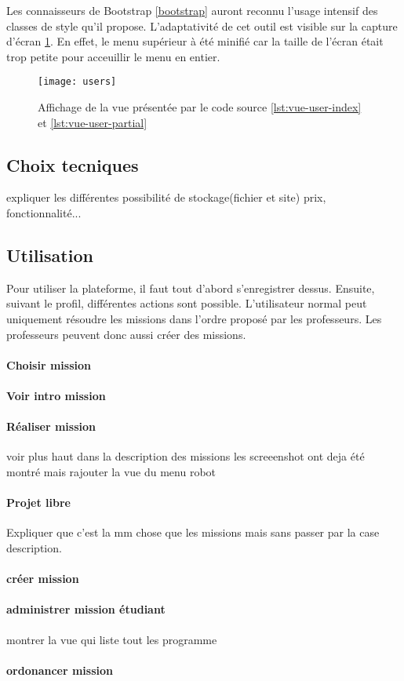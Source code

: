 Les connaisseurs de Bootstrap \ref{bootstrap} auront reconnu l'usage intensif des classes de style qu'il propose. L'adaptativité de cet outil est visible sur la capture d'écran \ref{fig:vue-users}. En effet, le menu supérieur à été minifié car la taille de l'écran était trop petite pour acceuillir le menu en entier.

\begin{figure}
  \begin{center}
    \texttt{[image: users]}
    \caption{Affichage de la vue présentée par le code source \ref{lst:vue-user-index} et \ref{lst:vue-user-partial}}
    \label{fig:vue-users}
  \end{center}
\end{figure}

\subsection{Choix tecniques}
expliquer les différentes possibilité de stockage(fichier et site) prix, fonctionnalité...

\subsection{Utilisation}
Pour utiliser la plateforme, il faut tout d'abord s'enregistrer dessus. Ensuite, suivant le profil, différentes actions sont possible. L'utilisateur normal peut uniquement résoudre les missions dans l'ordre proposé par les professeurs. Les professeurs peuvent donc aussi créer des missions.

\paragraph{Choisir mission}

\paragraph{Voir intro mission}

\paragraph{Réaliser mission} voir plus haut dans la description des missions les screeenshot ont deja été montré mais rajouter la vue du menu robot

\paragraph{Projet libre}
Expliquer que c'est la mm chose que les missions mais sans passer par la case description.

\paragraph{créer mission}

\paragraph{administrer mission étudiant} montrer la vue qui liste tout les programme

\paragraph{ordonancer mission}

